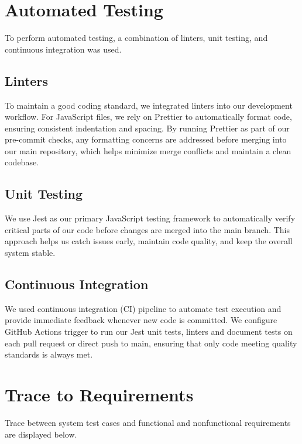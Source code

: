 \documentclass[12pt, titlepage]{article}
\begin{document}
\newpage{}

\section{Automated Testing}

\hspace{2em}To perform automated testing, a combination of linters, unit testing, and continuous integration was used.

\subsection{Linters}
\hspace{2em}To maintain a good coding standard, we integrated linters into
our development workflow. For JavaScript files, we rely on Prettier to
automatically format code, ensuring consistent indentation and spacing.
By running Prettier as part of our pre-commit checks, any formatting concerns
are addressed before merging into our main repository, which helps minimize merge
conflicts and maintain a clean codebase.

\subsection{Unit Testing}
\hspace{2em}We use Jest as our primary JavaScript testing framework to automatically verify critical parts 
of our code before changes are merged into the main branch. This approach helps us catch issues 
early, maintain code quality, and keep the overall system stable.

\subsection{Continuous Integration}
\hspace{2em}We used continuous integration (CI) pipeline to automate test execution
and provide immediate feedback whenever new code is committed. We configure GitHub
Actions trigger to run our Jest unit tests, linters and document tests on each pull request 
or direct push to main, ensuring that only code meeting quality standards is always met.


\newpage
\section{Trace to Requirements}

\hspace{2em}Trace between system test cases and functional and nonfunctional requirements are displayed below.
\end{document}
